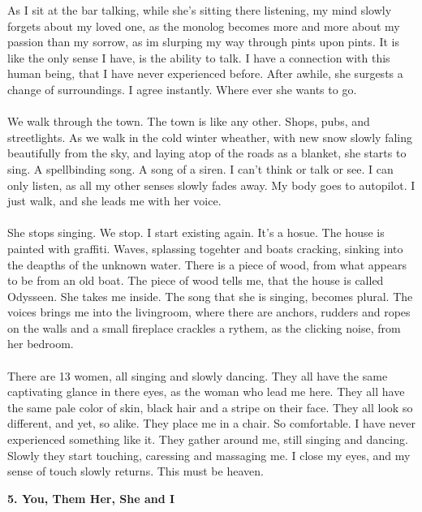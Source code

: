 \documentclass[]{article}
\begin{document}
As I sit at the bar talking, while she's sitting there listening, my mind slowly forgets about my loved one, as the monolog becomes more and more about my passion than my sorrow, as im slurping my way through pints upon pints. It is like the only sense I have, is the ability to talk. I have a connection with this human being, that I have never experienced before. After awhile, she surgests a change of surroundings. I agree instantly. Where ever she wants to go. 
\\ \\
We walk through the town. The town is like any other. Shops, pubs, and streetlights. As we walk in the cold winter wheather, with new snow slowly faling beautifully from the sky, and laying atop of the roads as a blanket, she starts to sing. A spellbinding song. A song of a siren. I can't think or talk or see. I can only listen, as all my other senses slowly fades away. My body goes to autopilot. I just walk, and she leads me with her voice. 
\\ \\
She stops singing. We stop. I start existing again. It's a hosue. The house is painted with graffiti. Waves, splassing togehter and boats cracking, sinking into the deapths of the unknown water. There is a piece of wood, from what appears to be from an old boat. The piece of wood tells me, that the house is called Odysseen. She takes me inside. The song that she is singing, becomes plural. The voices brings me into the livingroom, where there are anchors, rudders and ropes on the walls and a small fireplace crackles a rythem, as the clicking noise, from her bedroom. 
\\ \\
There are 13 women, all singing and slowly dancing. They all have the same captivating glance in there eyes, as the woman who lead me here. They all have the same pale color of skin, black hair and a stripe on their face. They all look so different, and yet, so alike. They place me in a chair. So comfortable. I have never experienced something like it. They gather around me, still singing and dancing. Slowly they start touching, caressing and massaging me. I close my eyes, and my sense of touch slowly returns. This must be heaven.

\begin{center}
	\large\textbf{5. You, Them Her, She and I}
\end{center}
\end{document}
